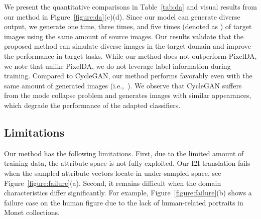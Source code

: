\documentclass[runningheads]{llncs}
\newlength\figmargin
\newlength\subfigmargin
\newlength\secmargin
\def\ie{i.e.,~}
\newcommand{\figref}[1]{Figure~\ref{figure:#1}}
\newcommand{\tabref}[1]{Table~\ref{tab:#1}}
\begin{document}
We present the quantitative comparisons in \tabref{da} and visual results from our method in Figure~\ref{figure:da}(c)(d).
Since our model can generate diverse output, we generate one time, three times, and five times (denoted as ) of target images using the same amount of source images.
Our results validate that the proposed method can simulate diverse images in the target domain and improve the performance in target tasks.
While our method does not outperform PixelDA, we note that unlike PixelDA, we do not leverage label information during training.
Compared to CycleGAN, our method performs favorably even with the same amount of generated images (\ie ).
We observe that CycleGAN suffers from the mode collapse problem and generates images with similar appearances, which degrade the performance of the adapted classifiers.



\begin{figure*}[t]
	\centering
    \vspace{\subfigmargin}
    \vspace{-3mm}
   
	\caption{\textbf{Failure Cases.} Typical cases: (a) Attribute space not fully exploited. (b) Distribution characteristic difference. }
	\label{figure:failure}
    \vspace{-5mm}
\end{figure*}
\vspace{-1mm}
\vspace{\secmargin}
\subsection{Limitations}
\label{subsec:limitation}
\vspace{\secmargin}
Our method has the following limitations.
First, due to the limited amount of training data, the attribute space is not fully exploited.
Our I2I translation fails when the sampled attribute vectors locate in under-sampled space, see \figref{failure}(a).
Second, it remains difficult when the domain characteristics differ significantly.
For example, \figref{failure}(b) shows a failure case on the human figure due to the lack of human-related portraits in Monet collections.
\vspace{-1mm}
\end{document}
